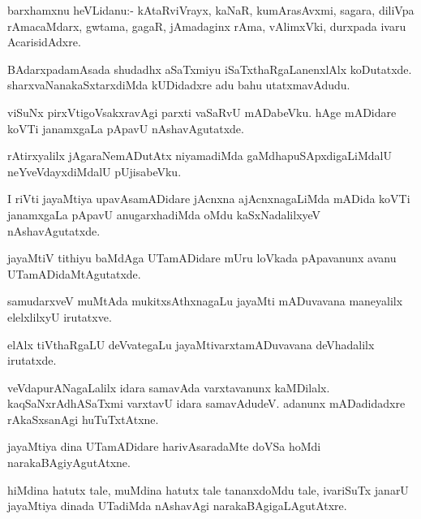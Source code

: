 \begin{mng}
barxhamxnu heVLidanu:- kAtaRviVrayx, kaNaR, kumArasAvxmi, sagara, diliVpa rAmacaMdarx, gwtama, gagaR, jAmadaginx rAma, vAlimxVki, durxpada ivaru AcarisidAdxre.
\end{mng}

\begin{mng}
BAdarxpadamAsada shudadhx aSaTxmiyu iSaTxthaRgaLanenxlAlx koDutatxde. sharxvaNanakaSxtarxdiMda kUDidadxre adu bahu utatxmavAdudu.
\end{mng}

\begin{mng}
viSuNx pirxVtigoVsakxravAgi parxti vaSaRvU mADabeVku. hAge mADidare koVTi janamxgaLa pApavU nAshavAgutatxde.
\end{mng}

\begin{mng}
rAtirxyalilx jAgaraNemADutAtx niyamadiMda gaMdhapuSApxdigaLiMdalU neYveVdayxdiMdalU pUjisabeVku.
\end{mng}

\begin{mng}
I riVti jayaMtiya upavAsamADidare jAcnxna ajAcnxnagaLiMda mADida koVTi janamxgaLa pApavU anugarxhadiMda oMdu kaSxNadalilxyeV nAshavAgutatxde.
\end{mng}

\begin{mng}
jayaMtiV tithiyu baMdAga UTamADidare mUru loVkada pApavanunx avanu UTamADidaMtAgutatxde.
\end{mng}

\begin{mng}
samudarxveV muMtAda mukitxsAthxnagaLu jayaMti mADuvavana maneyalilx elelxlilxyU irutatxve.
\end{mng}

\begin{mng}
elAlx tiVthaRgaLU deVvategaLu jayaMtivarxtamADuvavana deVhadalilx irutatxde.
\end{mng}

\begin{mng}
veVdapurANagaLalilx idara samavAda varxtavanunx kaMDilalx. kaqSaNxrAdhASaTxmi varxtavU idara samavAdudeV. adanunx mADadidadxre rAkaSxsanAgi huTuTxtAtxne.
\end{mng}

\begin{mng}
jayaMtiya dina UTamADidare harivAsaradaMte doVSa hoMdi narakaBAgiyAgutAtxne.
\end{mng}

\begin{mng}
hiMdina hatutx tale, muMdina hatutx tale tananxdoMdu tale, ivariSuTx janarU jayaMtiya dinada UTadiMda nAshavAgi narakaBAgigaLAgutAtxre.
\end{mng}

